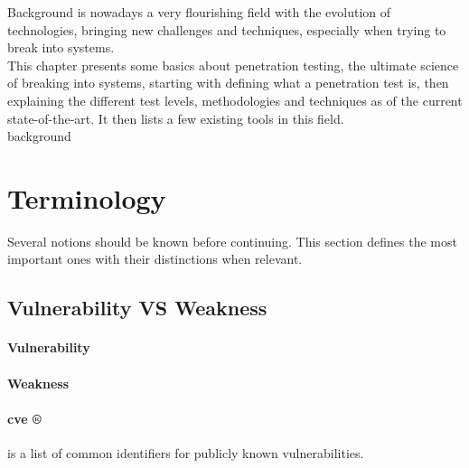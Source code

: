 \begin{chaptercover}{Background}%
{
{\large \hyphenation{}  is nowadays a very flourishing field with the evolution of technologies, bringing new challenges and techniques, especially when trying to break into systems. \newline \\ This chapter presents some basics about penetration testing, the ultimate science of breaking into systems, starting with defining what a penetration test is, then explaining the different test levels, methodologies and techniques as of the current state-of-the-art. It then lists a few existing tools in this field.\newline\\}}%
{background}

\section{Terminology}

Several notions should be known before continuing. This section defines the most important ones with their distinctions when relevant.

\subsection{Vulnerability VS Weakness}\label{subsec:vuln-vs-weakness}

\paragraph{Vulnerability} 


\paragraph{Weakness} 


\paragraph{\acrfull{cve} ®} is a list of common identifiers for publicly known vulnerabilities.


\end{chaptercover}
